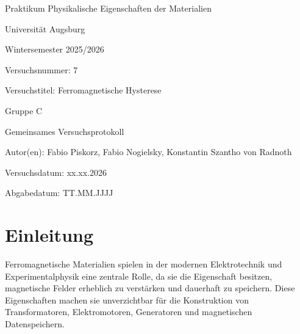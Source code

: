 \documentclass[11pt,a4paper]{article}
\numberwithin{equation}{section}
\newcommand{\Lehrveranstaltung}{Praktikum Physikalische Eigenschaften der Materialien}
\newcommand{\Universitaet}{Universität Augsburg}
\newcommand{\Semester}{Wintersemester 2025/2026}
\newcommand{\Versuchsnummer}{7}
\newcommand{\Versuchstitel}{Ferromagnetische Hysterese}
\newcommand{\Gruppe}{C}
\newcommand{\Versuchsdatum}{xx.xx.2026}
\newcommand{\Abgabedatum}{TT.MM.JJJJ}
\newcommand{\Abgabeart}{Gemeinsames Versuchsprotokoll}
\newcommand{\Autor}{Fabio Piskorz, Fabio Nogielsky, Konstantin Szantho von Radnoth }
\begin{document}

\begin{titlepage}
    \centering
    {\Large \Lehrveranstaltung\par}
    \vspace{0.5cm}
    {\large \Universitaet\par}
    \vspace{0.5cm}
    {\large \Semester\par}
    \vspace{1.5cm}
    {\Large Versuchsnummer: \Versuchsnummer\par}
    \vspace{0.5cm}
    {\Large Versuchstitel: \Versuchstitel\par}
    \vspace{1.5cm}
    {\large Gruppe \Gruppe\par}
    \vspace{0.5cm}
    {\LARGE \Abgabeart\par}
    \vspace{0.5cm}
    {\large Autor(en): \Autor\par}
    \vspace{1.5cm}
    {\large Versuchsdatum: \Versuchsdatum\par}
    \vspace{0.5cm}
    {\large Abgabedatum: \Abgabedatum\par}

    \vfill
\end{titlepage}


\tableofcontents
\newpage

\section{Einleitung}
Ferromagnetische Materialien spielen in der modernen Elektrotechnik und Experimentalphysik eine zentrale Rolle, da sie die Eigenschaft besitzen, magnetische Felder erheblich zu verstärken und dauerhaft zu speichern. Diese Eigenschaften machen sie unverzichtbar für die Konstruktion von Transformatoren, Elektromotoren, Generatoren und magnetischen Datenspeichern. 
\end{document}
